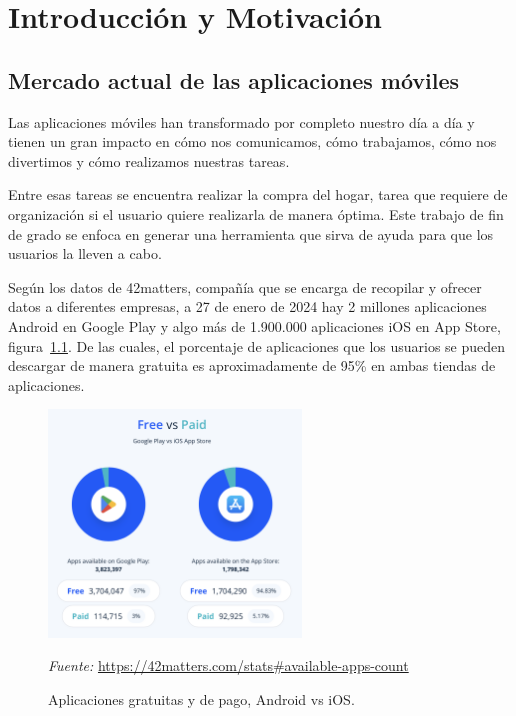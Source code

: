 \cleardoublepage
\chapter{Introducción y Motivación}
\label{sec:intro} %


\section{Mercado actual de las aplicaciones móviles}

Las aplicaciones móviles han transformado por completo nuestro día  a día y tienen un gran impacto en cómo nos comunicamos, cómo trabajamos, cómo nos divertimos y cómo realizamos nuestras tareas.

Entre esas tareas se encuentra realizar la compra del hogar, tarea que requiere de organización si el usuario quiere realizarla de manera óptima. Este trabajo de fin de grado se enfoca en generar una herramienta que sirva de ayuda para que los usuarios la lleven a cabo.

Según los datos de 42matters, compañía que se encarga de recopilar y ofrecer datos a diferentes empresas, a 27 de enero de 2024 hay 2 millones aplicaciones Android en Google Play y algo más de 1.900.000 aplicaciones iOS en App Store, figura~\ref{fig:apps_free_vs_pay}. De las cuales, el porcentaje de aplicaciones que los usuarios se pueden descargar de manera gratuita es aproximadamente de 95\% en ambas tiendas de aplicaciones.

\begin{figure}[H]
\centering
\includegraphics[width=0.6\textwidth]{./img/intro/apps_free_vs_pay.png}
\caption{Aplicaciones gratuitas y de pago, Android vs iOS.}
\label{fig:apps_free_vs_pay}
\vspace{0.2em}
{\footnotesize \centering \textit{Fuente:} \url{https://42matters.com/stats#available-apps-count} \par}
\end{figure}

